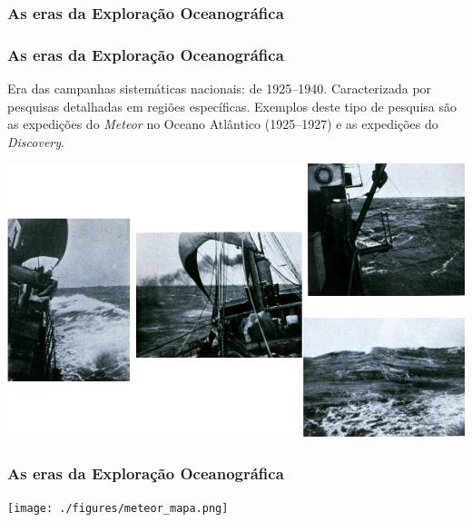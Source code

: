 \begin{frame}
    \frametitle{As eras da Exploração Oceanográfica}
    \centerline{}
\end{frame}

\begin{frame}
    \frametitle{As eras da Exploração Oceanográfica}
    \small{Era das campanhas sistemáticas nacionais: de 1925--1940.
    Caracterizada por pesquisas detalhadas em regiões específicas.  Exemplos
    deste tipo de pesquisa são as expedições do {\it Meteor} no Oceano Atlântico
    (1925--1927) e as expedições do {\it Discovery}.}
    \centerline{\includegraphics[scale=0.2]{./figures/meteor.png}}
\end{frame}

\begin{frame}
    \frametitle{As eras da Exploração Oceanográfica}
    \centerline{\texttt{[image: ./figures/meteor\_mapa.png]}}
\end{frame}

